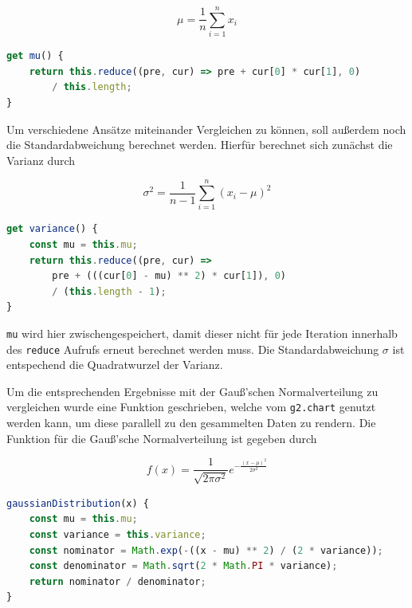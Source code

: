 \begin{equation}
    \mu = \frac{1}{n} \sum_{i=1}^n{x_i}
\end{equation}

\begin{lstlisting}[language=JavaScript, caption={Definition der \lstinline{mu} Funktion, welche den Erwartungswert der Daten in \lstinline{Data} berechnet.},label={lst:data_mu}]
get mu() {
    return this.reduce((pre, cur) => pre + cur[0] * cur[1], 0)
        / this.length;
}
\end{lstlisting}

Um verschiedene Ansätze miteinander Vergleichen zu können, soll au{\ss}erdem noch die Standardabweichung berechnet werden.
Hierfür berechnet sich zunächst die Varianz durch

\begin{equation}
    \sigma^2 = \frac{1}{n - 1} \sum_{i=1}^n(x_i - \mu)^2
\end{equation}

\begin{lstlisting}[language=JavaScript, caption={Definition der \lstinline{variance} Funktion, welche die Varianz der Daten in \lstinline{Data} berechnet}, label={lst:data_variance}]
get variance() {
    const mu = this.mu;
    return this.reduce((pre, cur) =>
        pre + (((cur[0] - mu) ** 2) * cur[1]), 0)
        / (this.length - 1);
}
\end{lstlisting}

\lstinline{mu} wird hier zwischengespeichert, damit dieser nicht für jede Iteration innerhalb des \lstinline{reduce} Aufrufs erneut berechnet werden muss.
Die Standardabweichung $\sigma$ ist entspechend die Quadratwurzel der Varianz.

Um die entsprechenden Ergebnisse mit der Gau{\ss}'schen Normalverteilung zu vergleichen wurde eine Funktion geschrieben, welche vom \lstinline{g2.chart} genutzt werden kann, um diese parallell zu den gesammelten Daten zu rendern.
Die Funktion für die Gau{\ss}'sche Normalverteilung ist gegeben durch

\begin{equation}
    f(x) = \frac{1}{\sqrt{2\pi\sigma^2}}e^{-\frac{(x-\mu)^2}{2\sigma^2}}
\end{equation}

\begin{lstlisting}[language=JavaScript, caption={Definition der \lstinline{gaussianDistribution} Funktion, welche die Normalverteilung für die gegebene Varianz und den Erwartungswert formt.}, label={lst:data_gauss}]
gaussianDistribution(x) {
    const mu = this.mu;
    const variance = this.variance;
    const nominator = Math.exp(-((x - mu) ** 2) / (2 * variance));
    const denominator = Math.sqrt(2 * Math.PI * variance);
    return nominator / denominator;
}
\end{lstlisting}

